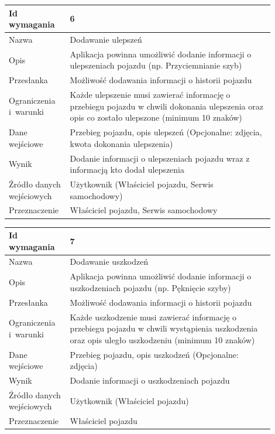 \documentclass[12pt]{article}
\begin{document}
\begin{table}[H]
\begin{center}
	\begin{tabular}{|p{0.18\linewidth}|p{0.72\linewidth}|}%
	\hline
	Id wymagania 	& 6 				\\ \hline
	Nazwa			& Dodawanie ulepszeń
 \\ \hline
	Opis &	Aplikacja powinna umożliwić dodanie informacji o ulepszeniach pojazdu (np. Przyciemnianie szyb)\\ \hline
	Przesłanka & Możliwość dodawania informacji o historii pojazdu  \\ \hline
	Ograniczenia i~warunki & Każde ulepszenie musi zawierać informację o przebiegu pojazdu w chwili dokonania ulepszenia oraz opis co zostało ulepszone (minimum 10 znaków) \\ \hline
	Dane wejściowe &Przebieg pojazdu, opis ulepszeń
(Opcjonalne: zdjęcia, kwota dokonania ulepszenia) \\ \hline
	Wynik & Dodanie informacji o ulepszeniach pojazdu wraz z informacją kto dodał ulepszenia\\ \hline
	Źródło danych wejściowych &Użytkownik (Właściciel pojazdu, Serwis samochodowy)\\ \hline
	Przeznaczenie &Właściciel pojazdu, Serwis samochodowy\\ \hline
	\end{tabular}
\end{center}
\end{table}

\begin{table}[H]
\begin{center}
	\begin{tabular}{|p{0.18\linewidth}|p{0.72\linewidth}|}%
	\hline
	Id wymagania 	& 7 				\\ \hline
	Nazwa			& Dodawanie uszkodzeń \\ \hline
	Opis &Aplikacja powinna umożliwić dodanie informacji o uszkodzeniach pojazdu (np. Pęknięcie szyby)\\ \hline
	Przesłanka & Możliwość dodawania informacji o historii pojazdu  \\ \hline
	Ograniczenia i~warunki & Każde uszkodzenie musi zawierać informację o przebiegu pojazdu w chwili wystąpienia uszkodzenia oraz opis uległo uszkodzeniu (minimum 10 znaków) \\ \hline
	Dane wejściowe &Przebieg pojazdu, opis uszkodzeń
(Opcjonalne: zdjęcia)\\ \hline
	Wynik & Dodanie informacji o uszkodzeniach pojazdu\\ \hline
	Źródło danych wejściowych &Użytkownik (Właściciel pojazdu)\\ \hline
Przeznaczenie & Właściciel pojazdu\\ \hline
	\end{tabular}
\end{center}
\end{table}
\end{document}
